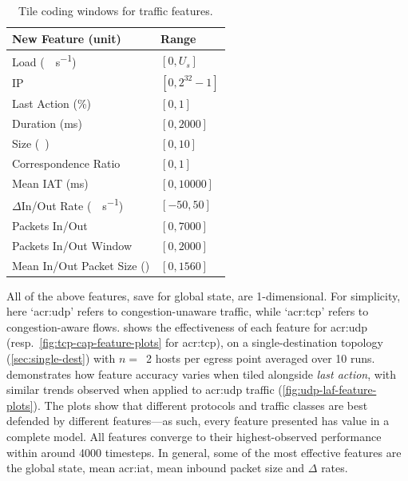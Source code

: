 \begin{table}
	\centering
	\caption{Tile coding windows for traffic features.\label{tab:codings}}
	
	\begin{tabular}{@{}ll@{}}
		\toprule
		New Feature (unit) & Range \\
		\midrule
		Load (\unit{\mega\bit\per\second}) & $[0, U_s]$ \\
		IP & $[0, 2^{32}-1]$ \\
		Last Action (\unit{\percent}) & $[0, 1]$ \\
		Duration (\unit{\milli\second}) & $[0, \num{2000}]$ \\
		Size (\unit{\mebi\byte}) & $[0,10]$ \\
		Correspondence Ratio & $[0,1]$ \\
		Mean IAT (\unit{\milli\second}) & $[0, \num{10000}]$ \\
		$\Delta$In/Out Rate (\unit{\mega\bit\per\second}) & $[-50, 50]$ \\
		Packets In/Out & $[0, 7000]$ \\
		Packets In/Out Window & $[0, 2000]$ \\
		Mean In/Out Packet Size (\unit{\byte}) & $[0, 1560]$ \\
		\bottomrule
	\end{tabular}
\end{table}

All of the above features, save for global state, are 1-dimensional.
For simplicity, here `\gls{acr:udp}' refers to congestion-unaware traffic, while `\gls{acr:tcp}' refers to congestion-aware flows.
 shows the effectiveness of each feature for \gls{acr:udp} (resp.\ \cref{fig:tcp-cap-feature-plots} for \gls{acr:tcp}), on a single-destination topology (\cref{sec:single-dest}) with $n=$~\num{2} hosts per egress point averaged over \num{10} runs.
 demonstrates how feature accuracy varies when tiled alongside \emph{last action}, with similar trends observed when applied to \gls{acr:udp} traffic (\cref{fig:udp-laf-feature-plots}).
The plots show that different protocols and traffic classes are best defended by different features---as such, every feature presented has value in a complete model.
All features converge to their highest-observed performance within around \num{4000} timesteps.
In general, some of the most effective features are the global state, mean \gls{acr:iat}, mean inbound packet size and $\Delta$ rates.
